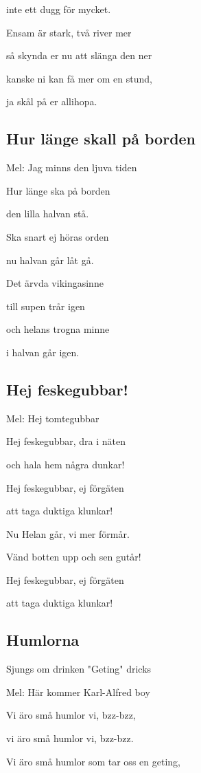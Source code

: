 inte ett dugg för mycket.\bigskip

Ensam är stark, två river mer

så skynda er nu att slänga den ner

kanske ni kan få mer om en stund,

ja skål på er allihopa. 

\subsection{\textbf{Hur länge skall på borden}}

Mel: Jag minns den ljuva tiden\bigskip


Hur länge ska på borden

den lilla halvan stå.

Ska snart ej höras orden

nu halvan går låt gå.

Det ärvda vikingasinne

till supen trår igen

och helans trogna minne

i halvan går igen. 

\subsection{\textbf{Hej feskegubbar!}}

Mel: Hej tomtegubbar\bigskip

Hej feskegubbar, dra i näten

och hala hem några dunkar!

Hej feskegubbar, ej förgäten

att taga duktiga klunkar!

Nu Helan går, vi mer förmår.

Vänd botten upp och sen gutår!

Hej feskegubbar, ej förgäten

att taga duktiga klunkar!

\subsection{\textbf{Humlorna}}

Sjungs om drinken "Geting" dricks

Mel: Här kommer Karl-Alfred boy\bigskip

Vi äro små humlor vi, bzz-bzz,

vi äro små humlor vi, bzz-bzz.

Vi äro små humlor som tar oss en geting,

